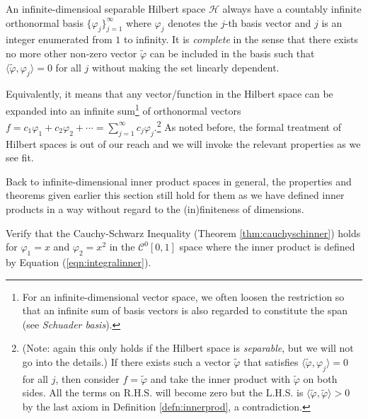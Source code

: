 \begin{proper}
\label{proper:hilbertorthosys}
An infinite-dimensioal separable Hilbert space $\mathcal{H}$ always have a countably infinite orthonormal basis $\{\varphi_j\}_{j=1}^{\infty}$ where $\varphi_j$ denotes the $j$-th basis vector and $j$ is an integer enumerated from $1$ to infinity. It is \textit{complete} in the sense that there exists no more other non-zero vector $\tilde{\varphi}$ can be included in the basis such that $\langle \tilde{\varphi}, \varphi_j \rangle = 0$ for all $j$ without making the set linearly dependent.
\end{proper}
Equivalently, it means that any vector/function in the Hilbert space can be expanded into an infinite sum\footnote{For an infinite-dimensional vector space, we often loosen the restriction so that an infinite sum of basis vectors is also regarded to constitute the span (see \textit{Schuader basis}).} of orthonormal vectors $f = c_1\varphi_1 + c_2\varphi_2 + \cdots = \sum_{j=1}^{\infty} c_j \varphi_j$.\footnote{(Note: again this only holds if the Hilbert space is \textit{separable}, but we will not go into the details.) If there exists such a vector $\tilde{\varphi}$ that satisfies $\langle \tilde{\varphi}, \varphi_j \rangle = 0$ for all $j$, then consider $f = \tilde{\varphi}$ and take the inner product with $\tilde{\varphi}$ on both sides. All the terms on R.H.S. will become zero but the L.H.S. is $\langle \tilde{\varphi}, \tilde{\varphi} \rangle > 0$ by the last axiom in Definition \ref{defn:innerprod}, a contradiction.} As noted before, the formal treatment of Hilbert spaces is out of our reach and we will invoke the relevant properties as we see fit.\par
Back to infinite-dimensional inner product spaces in general, the properties and theorems given earlier this section still hold for them as we have defined inner products in a way without regard to the (in)finiteness of dimensions.
\begin{exmp}
Verify that the Cauchy-Schwarz Inequality (Theorem \ref{thm:cauchyschinner}) holds for $\varphi_1 = x$ and $\varphi_2 = x^2$ in the $\mathcal{C}^0[0,1]$ space where the inner product is defined by Equation (\ref{eqn:integralinner}).
\end{exmp}
